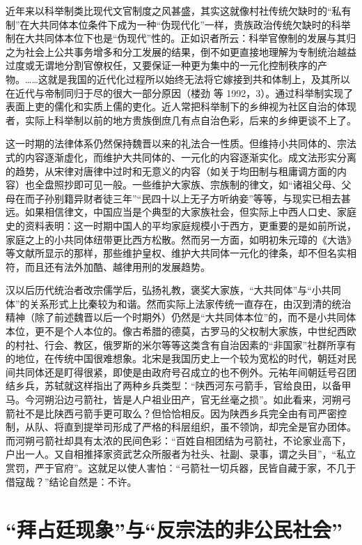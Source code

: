 \documentclass[a4paper,12pt,punct=kaiming]{ctexart}
\begin{document}
近年来以科举制类比现代文官制度之风甚盛，其实这就像村社传统欠缺时的“私有制”在大共同体本位条件下成为一种“伪现代化”一样，贵族政治传统欠缺时的科举制在大共同体本位下也是“伪现代”性的。正如识者所云：科举官僚制的发展与其归之为社会上公共事务增多和分工发展的结果，倒不如更直接地理解为专制统治越益过度或无谓地分割官僚权任，又要保证一种更为集中的一元化控制秩序的产物。……这就是我国的近代化过程所以始终无法将它嫁接到共和体制上，及其所以在近代与帝制同归于尽的很大一部分原因（楼劲 等 1992，3）。通过科举制实现了表面上吏的儒化和实质上儒的吏化。近人常把科举制下的乡绅视为社区自治的体现者，实际上科举制以前的地方贵族倒庶几有点自治色彩，后来的乡绅更谈不上了。

这一时期的法律体系仍然保持魏晋以来的礼法合一性质。但维持小共同体的、宗法式的内容逐渐虚化，而维护大共同体的、一元化的内容逐渐实化。成文法形实分离的趋势，从宋律对唐律中过时和无意义的内容（如关于均田制与租庸调方面的内容）也全盘照抄即可见一般。一些维护大家族、宗族制的律文，如“诸祖父母、父母在而子孙别籍异财者徒三年”“民四十以上无子方听纳妾”等等，与现实已相去甚远。如果相信律文，中国应当是个典型的大家族社会，但实际上中西人口史、家庭史的资料表明：这一时期中国人的平均家庭规模小于西方，更重要的是如前所说，家庭之上的小共同体纽带更比西方松散。然而另一方面，如明初朱元璋的《大诰》等文献所显示的那样，那些维护皇权、维护大共同体一元化的律条，却不但名实相符，而且还有法外加酷、越律用刑的发展趋势。

汉以后历代统治者改宗儒学后，弘扬礼教，褒奖大家族，“大共同体”与“小共同体”的关系形式上比秦较为和谐。然而实际上法家传统一直存在，由汉到清的统治精神（除了前述魏晋以后一个时期外）仍然是“大共同体本位”的，而不是小共同体本位，更不是个人本位的。像古希腊的德莫，古罗马的父权制大家族，中世纪西欧的村社、行会、教区，俄罗斯的米尔等等这类含有自治因素的“非国家”社群所享有的地位，在传统中国很难想象。北宋是我国历史上一个较为宽松的时代，朝廷对民间共同体还是盯得很紧，即使是由政府号召成立的也不例外。元祐年间朝廷号召团结乡兵，苏轼就这样指出了两种乡兵类型：“陕西河东弓箭手，官给良田，以备甲马。今河朔沿边弓箭社，皆是人户祖业田产，官无丝毫之损”。如此看来，河朔弓箭社不是比陕西弓箭手更可取么？但恰恰相反。因为陕西乡兵完全由有司严密控制，从队、将直到提举司形成了严格的科层组织，虽不领饷，却完全是官办团体。而河朔弓箭社却具有太浓的民间色彩：“百姓自相团结为弓箭社，不论家业高下，户出一人。又自相推择家资武艺众所服者为社头、社副、录事，谓之头目”，“私立赏罚，严于官府”。这就足以使人害怕：“弓箭社一切兵器，民皆自藏于家，不几于借寇哉？”结论自然是：不许。

\section*{“拜占廷现象”与“反宗法的非公民社会”}
\end{document}
